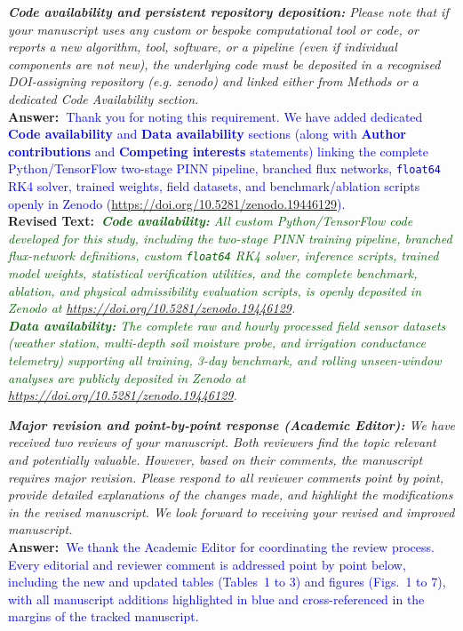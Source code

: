 \documentclass[10pt]{article}
\newcommand{\query}[2][]{\ifthenelse{\equal{#1}{}}{}{\textbf{#1:}~}\emph{#2}}
\newcommand{\ans}[1]{\textbf{Answer:~}#1}
\newcommand{\Rtext}[1]{\textbf{Revised Text:~}#1}
\begin{document}
\query[E-1.2]{\textbf{Code availability and persistent repository deposition:} Please note that if your manuscript uses any custom or bespoke computational tool or code, or reports a new algorithm, tool, software, or a pipeline (even if individual components are not new), the underlying code must be deposited in a recognised DOI-assigning repository (e.g. zenodo) and linked either from Methods or a dedicated Code Availability section.}\\
\ans{\textcolor{blue}{Thank you for noting this requirement. We have added dedicated \textbf{Code availability} and \textbf{Data availability} sections (along with \textbf{Author contributions} and \textbf{Competing interests} statements) linking the complete Python/TensorFlow two-stage PINN pipeline, branched flux networks, \texttt{float64} RK4 solver, trained weights, field datasets, and benchmark/ablation scripts openly in Zenodo (\url{https://doi.org/10.5281/zenodo.19446129}).}}\\
\Rtext{\emph{\textcolor{darkgreen}{\textbf{Code availability:} All custom Python/TensorFlow code developed for this study, including the two-stage PINN training pipeline, branched flux-network definitions, custom \texttt{float64} RK4 solver, inference scripts, trained model weights, statistical verification utilities, and the complete benchmark, ablation, and physical admissibility evaluation scripts, is openly deposited in Zenodo at \url{https://doi.org/10.5281/zenodo.19446129}.\\
\textbf{Data availability:} The complete raw and hourly processed field sensor datasets (weather station, multi-depth soil moisture probe, and irrigation conductance telemetry) supporting all training, 3-day benchmark, and rolling unseen-window analyses are publicly deposited in Zenodo at \url{https://doi.org/10.5281/zenodo.19446129}.}}}

\query[E-1.3]{\textbf{Major revision and point-by-point response (Academic Editor):} We have received two reviews of your manuscript. Both reviewers find the topic relevant and potentially valuable. However, based on their comments, the manuscript requires major revision. Please respond to all reviewer comments point by point, provide detailed explanations of the changes made, and highlight the modifications in the revised manuscript. We look forward to receiving your revised and improved manuscript.}\\
\ans{\textcolor{blue}{We thank the Academic Editor for coordinating the review process. Every editorial and reviewer comment is addressed point by point below, including the new and updated tables (Tables~1 to 3) and figures (Figs.~1 to 7), with all manuscript additions highlighted in blue and cross-referenced in the margins of the tracked manuscript.}}
\end{document}
